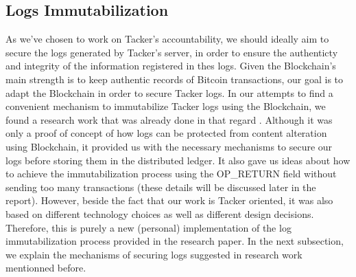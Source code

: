\subsection{Logs Immutabilization}       
As we've chosen to work on Tacker's accountability, we should ideally aim to secure the logs generated by Tacker's server, in order to ensure the authenticty and integrity of the information registered in thes logs. Given the Blockchain's main strength is to keep authentic records of Bitcoin transactions, our goal is to adapt the Blockchain in order to secure Tacker logs. In our attempts to find a convenient mechanism to immutabilize Tacker logs using the Blockchain, we found a research work that was already done in that regard \cite{immute}. Although it was only a proof of concept of how logs can be protected from content alteration using Blockchain, it provided us with the necessary mechanisms to secure our logs before storing them in the distributed ledger. It also gave us ideas about how to achieve the immutabilization process using the OP\_RETURN field without sending too many transactions (these details will be discussed later in the report). However, beside the fact that our work is Tacker oriented, it was also based on different technology choices as well as different design decisions. Therefore, this is purely a new (personal) implementation of the log immutabilization process provided in the research paper. In the next subsection, we explain the mechanisms of securing logs suggested in research work mentionned before.
